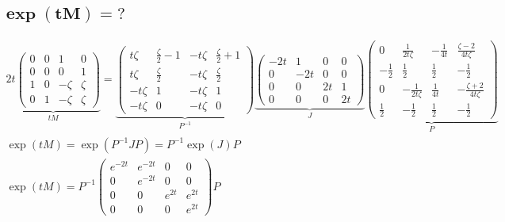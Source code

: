 \documentclass[10pt,a4paper]{article}
\newcommand{\mat}[1]{
    \begin{pmatrix}
        #1
    \end{pmatrix}
}
\begin{document}
\subsection{
    \texorpdfstring{
        $\pmb{ \exp(tM) = \mathit{?} }$
    }{
        exp(tM) = ?
    }
}
\begin{gather*}
    \underbrace{
        2t
        \mat{
            0 & 0 & 1 & 0 \\
            0 & 0 & 0 & 1 \\
            1 & 0 & - \zeta & \zeta \\
            0 & 1 & - \zeta & \zeta
        }
    }_{
        tM
    }
    =
    \underbrace{
        \mat{t \zeta & \frac{\zeta}{2} - 1 & - t \zeta & \frac{\zeta}{2} + 1\\t \zeta & \frac{\zeta}{2} & - t \zeta & \frac{\zeta}{2}\\- t \zeta & 1 & - t \zeta & 1\\- t \zeta & 0 & - t \zeta & 0}
    }_{
        P^{-1}
    }
    \underbrace{
        \mat{- 2 t & 1 & 0 & 0\\0 & - 2 t & 0 & 0\\0 & 0 & 2 t & 1\\0 & 0 & 0 & 2 t}
    }_{
        J
    }
    \underbrace{
        \mat{0 & \frac{1}{2 t \zeta} & - \frac{1}{4 t} & \frac{\zeta - 2}{4 t \zeta}\\- \frac{1}{2} & \frac{1}{2} & \frac{1}{2} & - \frac{1}{2}\\0 & - \frac{1}{2 t \zeta} & \frac{1}{4 t} & - \frac{\zeta + 2}{4 t \zeta}\\\frac{1}{2} & - \frac{1}{2} & \frac{1}{2} & - \frac{1}{2}}
    }_{
        P
    }
    \\[25pt]
    \exp(tM) = \exp(P^{-1} J P) = P^{-1} \exp(J) P
    \\[15pt]
    \exp(tM) = P^{-1} \mat{
        e^{- 2 t} & e^{- 2 t} & 0 & 0\\0 & e^{- 2 t} & 0 & 0\\0 & 0 & e^{2 t} & e^{2 t}\\0 & 0 & 0 & e^{2 t}
    } P
    \\[25pt]
\end{gather*}
\end{document}
